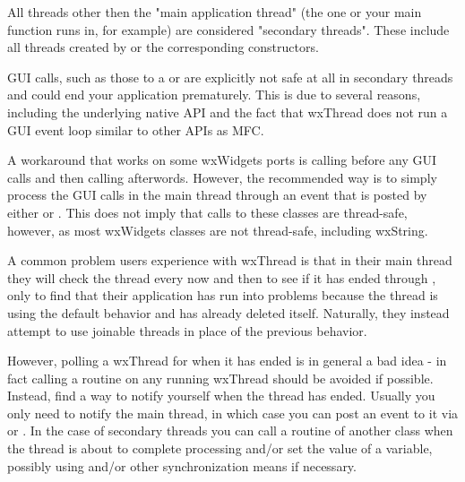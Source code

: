 \label{secondarywxthread}

All threads other then the "main application thread" (the one
 or your main function runs in, for 
example) are considered "secondary threads". These include all threads created 
by  or the corresponding constructors.

GUI calls, such as those to a  or 
 are explicitly not safe at all in secondary threads 
and could end your application prematurely. This is due to several reasons,
including the underlying native API and the fact that wxThread does not run a 
GUI event loop similar to other APIs as MFC. 

A workaround that works on some wxWidgets ports is calling  
before any GUI calls and then calling  afterwords. However,
the recommended way is to simply process the GUI calls in the main thread 
through an event that is posted by either  or
. This does 
not imply that calls to these classes are thread-safe, however, as most 
wxWidgets classes are not thread-safe, including wxString.

\label{dontpollwxthread}

A common problem users experience with wxThread is that in their main thread
they will check the thread every now and then to see if it has ended through
, only to find that their 
application has run into problems because the thread is using the default
behavior and has already deleted itself. Naturally, they instead attempt to
use joinable threads in place of the previous behavior.

However, polling a wxThread for when it has ended is in general a bad idea -
in fact calling a routine on any running wxThread should be avoided if 
possible. Instead, find a way to notify yourself when the thread has ended.
Usually you only need to notify the main thread, in which case you can post
an event to it via  or
. In 
the case of secondary threads you can call a routine of another class
when the thread is about to complete processing and/or set the value
of a variable, possibly using  and/or other 
synchronization means if necessary.

